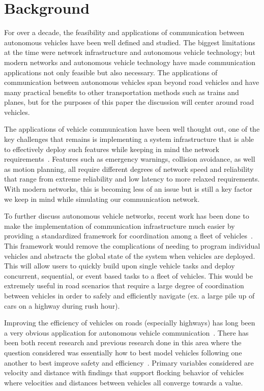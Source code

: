 \section{Background}

For over a decade, the feasibility and applications of communication between autonomous
vehicles have been well defined and studied. The biggest limitations at the time were
network infrastructure and autonomous vehicle technology; but modern networks and
autonomous vehicle technology have made communication applications not only feasible
but also necessary. The applications of communication between autonomous vehicles
span beyond road vehicles and have many practical benefits to other transportation methods
such as trains and planes, but for the purposes of this paper the discussion will center
around road vehicles.

The applications of vehicle communication have been well thought out, one of the key
challenges that remains is implementing a system infrastructure that is able to
effectively deploy such features while keeping in mind the network requirements~\cite{willke2009survey}.
Features such as emergency warnings, collision avoidance, as well as motion planning,
all require different degrees of network speed and reliability that range from
extreme reliability and low latency to more relaxed requirements. With modern networks,
this is becoming less of an issue but is still a key factor we keep in mind while
simulating our communication network.

To further discuss autonomous vehicle networks, recent work has been done to make
the implementation of communication infrastructure much easier by providing a standardized
framework for coordination among a fleet of vehicles~\cite{keila2018}.
This framework would remove
the complications of needing to program individual vehicles and abstracts the global
state of the system when vehicles are deployed. This will allow users to quickly build
upon single vehicle tasks and deploy concurrent, sequential, or event based tasks
to a fleet of vehicles. This would be extremely useful in road scenarios that require
a large degree of coordination between vehicles in order to safely and efficiently
navigate (ex. a large pile up of cars on a highway during rush hour).

Improving the efficiency of vehicles on roads (especially highways) has long been a
very obvious application for autonomous vehicle communication~\cite{murray2007recent}.
There has been both recent research and previous research done in this area where the question
considered was essentially how to best model vehicles following one another to best
improve safety and efficiency~\cite{ou2017extended, tanner2003coordination}.
Primary variables considered are velocity
and distance with findings that support flocking behavior of vehicles where velocities
and distances between vehicles all converge towards a value.

